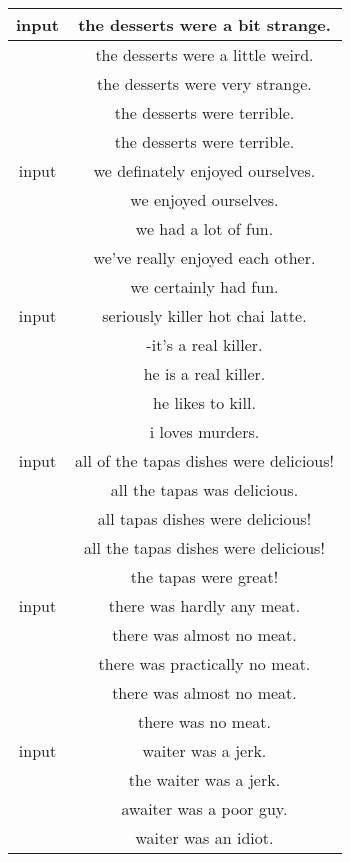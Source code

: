 \begin{table}[ht]
\begin{tabular}[t]{c|c}
\small input	&\small  the desserts were a bit strange. 	\\\hline
\small &	\small 	the desserts were a little weird. 	\\
\small 	&\small the desserts were very strange. 	\\
\small &\small 	the desserts were terrible. \\
\small &\small 	the desserts were terrible.
\\
\hline
\small input	&\small  we definately enjoyed ourselves.	\\\hline
\small &	\small we enjoyed ourselves.  	\\
\small 	&\small we had a lot of fun. 		\\
\small &\small 	we've really enjoyed each other. \\
\small &\small we certainly had fun. \\
\hline
\small input &\small 	seriously killer hot chai latte. 	\\\hline
\small &\small 	-it's a real killer. 	\\
\small 	&\small he is a real killer. 	\\
\small & \small he likes to kill. 	\\
\small 	& \small i loves murders. \\
\hline
\small input	&\small all of the tapas dishes were delicious! 	 \\	\hline
\small &\small all the tapas was delicious.  	\\
\small \small	&all tapas dishes were delicious!  	\\
\small &\small	all the tapas dishes were delicious! 	\\
\small \small	&the tapas were great!  	\\
\hline
\small input	&\small  there was hardly any meat. 	 	\\\hline
\small &	\small there was almost no meat. 	\\
\small 	&\small there was practically no meat. 	\\
\small &\small 	there was almost no meat. \\
\small &\small 	there was no meat.
\\
\hline
\small input	&\small  waiter was a jerk. 	\\\hline
\small &	\small the waiter was a jerk. 	\\
\small 	&\small awaiter was a poor guy. \\
\small &\small 	waiter was an idiot. \\

\end{tabular}
\end{table}
